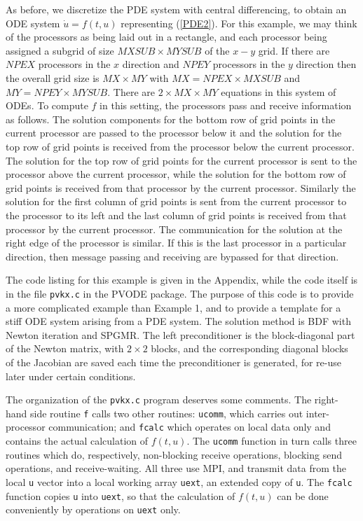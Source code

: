 As before, we discretize the PDE system with central differencing, to obtain
an ODE system $\dot{u} = f(t,u)$ representing (\ref{PDE2}). For this
example, we may think of the processors as being laid out in a rectangle,
and each processor being assigned a subgrid of size $MXSUB\times MYSUB$ of
the $x-y$ grid. If there are $NPEX$ processors in the $x$ direction and $NPEY
$ processors in the $y$ direction then the overall grid size is $MX\times MY$
with $MX=NPEX\times MXSUB$ and $MY=NPEY\times MYSUB.$ There are $2\times
MX\times MY$ equations in this system of ODEs. To compute $f$ in this
setting, the processors pass and receive information as follows. The
solution components for the bottom row of grid points in the current
processor are passed to the processor below it and the solution for the top
row of grid points is received from the processor below the current
processor. The solution for the top row of grid points for the current
processor is sent to the processor above the current processor, while the
solution for the bottom row of grid points is received from that processor
by the current processor. Similarly the solution for the first column of
grid points is sent from the current processor to the processor to its left
and the last column of grid points is received from that processor by the
current processor. The communication for the solution at the right edge of
the processor is similar. If this is the last processor in a particular
direction, then message passing and receiving are bypassed for that
direction.

The code listing for this example is given in the Appendix, while the code
itself is in the file {\tt pvkx.c} in the PVODE package. The purpose of this
code is to provide a more complicated example than Example 1, and to provide
a template for a stiff ODE system arising from a PDE system. The solution
method is BDF with Newton iteration and SPGMR. The left preconditioner is
the block-diagonal part of the Newton matrix, with $2 \times 2$ blocks, and
the corresponding diagonal blocks of the Jacobian are saved each time the
preconditioner is generated, for re-use later under certain conditions. 

The organization of the {\tt pvkx.c} program deserves some comments. The
right-hand side routine {\tt f} calls two other routines: {\tt ucomm}, which
carries out inter-processor communication; and {\tt fcalc} which operates on
local data only and contains the actual calculation of $f(t,u)$. The 
{\tt ucomm} function in turn calls three routines which do, respectively,
non-blocking receive operations, blocking send operations, and
receive-waiting. All three use MPI, and transmit data from the local {\tt u}
vector into a local working array {\tt uext}, an extended copy of {\tt u}.
The {\tt fcalc} function copies {\tt u} into {\tt uext}, so that the
calculation of $f(t,u)$ can be done conveniently by operations on 
{\tt uext} only.

